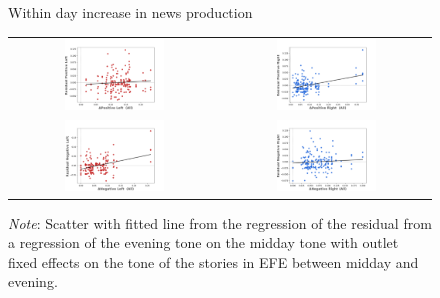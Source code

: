 \documentclass[12pt]{article}
\begin{document}
\begin{figure}[ht!]
		\caption{Within day increase in news production}
	\centering
	\begin{tabular}{@{}cc@{}}
		\includegraphics[width=0.5\textwidth]{figures/char_pos_left_residual} &
		\includegraphics[width=0.5\textwidth]{figures/char_pos_right_residual} \\[-.2pt]
		\includegraphics[width=0.5\textwidth]{figures/char_neg_left_residual} &
		\includegraphics[width=0.5\textwidth]{figures/char_neg_right_residual}
	\end{tabular}
	\caption*{\textit{Note}: \small Scatter with fitted line from the regression of the residual from a regression of the evening tone on the midday tone with outlet fixed effects on the tone of the stories in EFE between midday and evening.}

	\label{fig:diff}
\end{figure}
\end{document}

